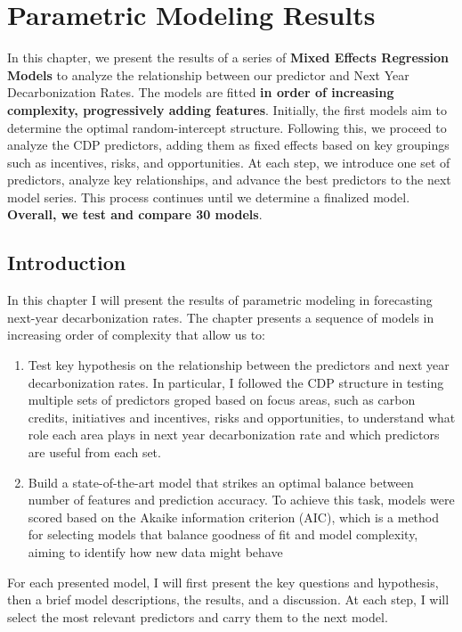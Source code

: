 \chapter{Parametric Modeling Results}
\label{chap:chapter4}

\begin{keytakeaway}
In this chapter, we present the results of a series of \textbf{Mixed Effects Regression Models} to analyze the relationship between our predictor and Next Year Decarbonization Rates. The models are fitted \textbf{in order of increasing complexity, progressively adding features}. Initially, the first models aim to determine the optimal random-intercept structure. Following this, we proceed to analyze the CDP predictors, adding them as fixed effects based on key groupings such as incentives, risks, and opportunities. At each step, we introduce one set of predictors, analyze key relationships, and advance the best predictors to the next model series. This process continues until we determine a finalized model. \textbf{Overall, we test and compare 30 models}.
\end{keytakeaway}

\section{Introduction}
In this chapter I will present the results of parametric modeling in forecasting next-year decarbonization rates. The chapter presents a sequence of models in increasing order of complexity that allow us to:
\begin{enumerate}
    \item Test key hypothesis on the relationship between the predictors and next year decarbonization rates. In particular, I followed the CDP structure in testing multiple sets of predictors groped based on focus areas, such as carbon credits, initiatives and incentives, risks and opportunities, to understand what role each area plays in next year decarbonization rate and which predictors are useful from each set. 
    \item Build a state-of-the-art model that strikes an optimal balance between number of features and prediction accuracy. To achieve this task, models were scored based on the Akaike information criterion (AIC), which is a method for selecting models that balance goodness of fit and model complexity, aiming to identify how new data might behave \cite{AIC}
\end{enumerate}
For each presented model, I will first present the key questions and hypothesis, then a brief model descriptions, the results, and a discussion. At each step, I will select the most relevant predictors and carry them to the next model. 

